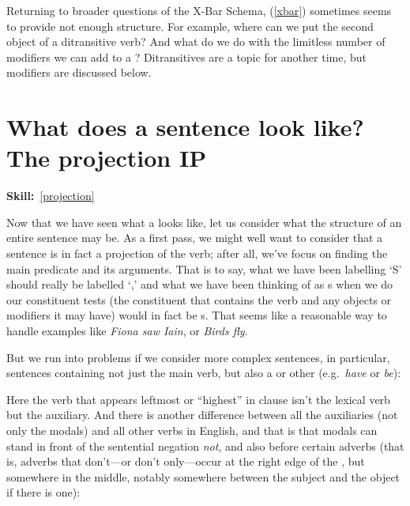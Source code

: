 \documentclass{article}
\begin{document}
Returning to broader questions of the X-Bar Schema, (\ref{xbar}) sometimes seems to provide not enough structure.
For example, where can we put the second object of a ditransitive verb?
And what do we do with the limitless number of modifiers we can add to a ?
Ditransitives are a topic for another time, but modifiers are discussed below. 

\section{What does a sentence look like? The projection IP}
\hfill{}\textbf{Skill:}~\ref{projection}

Now that we have seen what a  looks like, let us consider what the structure of an entire sentence may be. As a first pass, we might well want to consider that a sentence is in fact a projection of the verb; after all, we've focus on finding the main predicate and its arguments. That is to say, what we have been labelling `S' should really be labelled `,' and what we have been thinking of as s when we do our constituent tests (the constituent that contains the verb and any objects or modifiers it may have) would in fact be s. That seems like a reasonable way to handle examples like \emph{Fiona saw Iain}, or \emph{Birds fly}.

But we run into problems if we consider more complex sentences, in particular, sentences containing not just the main verb, but also a  or other  (e.g.\ \emph{have} or \emph{be}):
\begin{exe}
    \label{aux}
\end{exe}

Here the verb that appears leftmost or ``highest'' in clause isn't the lexical verb but the auxiliary. And there is another difference between all the auxiliaries (not only the modals) and all other verbs in English, and that is that modals can stand in front of the sentential negation \emph{not}, and also before certain   adverbs (that is, adverbs that don't---or don't only---occur at the right edge of the , but somewhere in the middle, notably somewhere between the subject and the object if there is one):
\begin{exe}
     \label{ex:aux1}
     \label{ex:aux2}
\end{exe}
\end{document}
